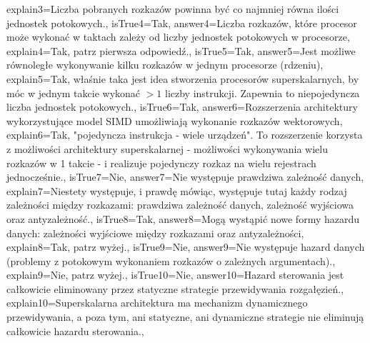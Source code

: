 \begin{enumerate}
\begin{minipage}{\textwidth}
{		explain3={Liczba pobranych rozkazów powinna być co najmniej równa ilości jednostek potokowych.},%
		isTrue4={Tak},%
		answer4={Liczba rozkazów, które procesor może wykonać w taktach zależy od liczby jednostek potokowych w procesorze},%
		explain4={Tak, patrz pierwsza odpowiedź.},%
		isTrue5={Tak},%
		answer5={Jest możliwe równoległe wykonywanie kilku rozkazów w jednym procesorze (rdzeniu)},%
		explain5={Tak, właśnie taka jest idea stworzenia procesorów superskalarnych, by móc w jednym takcie wykonać $>1$ liczby instrukcji. Zapewnia to niepojedyncza liczba jednostek potokowych.},%
		isTrue6={Tak},%
		answer6={Rozszerzenia architektury wykorzystujące model SIMD umożliwiają wykonanie rozkazów wektorowych},%
		explain6={Tak, "pojedyncza instrukcja - wiele urządzeń". To rozszerzenie korzysta z możliwości architektury superskalarnej - możliwości wykonywania wielu rozkazów w 1 takcie - i realizuje pojedynczy rozkaz na wielu rejestrach jednocześnie.},%
		isTrue7={Nie},%
		answer7={Nie występuje prawdziwa zależność danych},%
		explain7={Niestety występuje, i prawdę mówiąc, występuje tutaj każdy rodzaj zależności między rozkazami: prawdziwa zależność danych, zależność wyjściowa oraz antyzależność.},%
		isTrue8={Tak},%
		answer8={Mogą wystąpić nowe formy hazardu danych: zależności wyjściowe między rozkazami oraz antyzależności},%
		explain8={Tak, patrz wyżej.},%
		isTrue9={Nie},%
		answer9={Nie występuje hazard danych (problemy z potokowym wykonaniem rozkazów o zależnych argumentach).},%
		explain9={Nie, patrz wyżej.},%
		isTrue10={Nie},%
		answer10={Hazard sterowania jest całkowicie eliminowany przez statyczne strategie przewidywania rozgałęzień.},%
		explain10={Superskalarna architektura ma mechanizm dynamicznego przewidywania, a poza tym, ani statyczne, ani dynamiczne strategie nie eliminują całkowicie hazardu sterowania.},%
	}
\end{minipage}
\begin{minipage}{\textwidth}
\end{minipage}
\end{enumerate}
